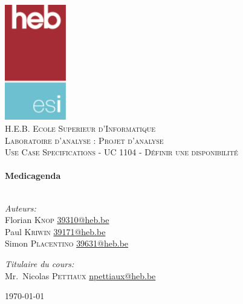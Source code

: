 \begin{titlepage}
	\begin{center}

		\includegraphics[keepaspectratio=true,width=0.20\textwidth]{../ressources/logo}\\[1cm]

		\textsc{\LARGE H.E.B. Ecole Superieur d'Informatique}\\[1.5cm]

		\textsc{\Large Laboratoire d'analyse : Projet d'analyse}\\[0.5cm]
		\textsc{\Large Use Case Specifications - UC 1104 - Définir une
		disponibilité}\\[0.5cm]

		\HRule \\[0.4cm]
		{\huge \bfseries Medicagenda \\[0.4cm]}
		\HRule \\[1.5cm]

		\noindent
		\begin{minipage}[t]{0.4\textwidth}
			\begin{flushleft} \large
				\emph{Auteurs:}\\
				Florian \textsc{Knop} \href{mailto:39310@heb.be}{39310@heb.be}\\
				Paul \textsc{Kriwin} \href{mailto:39171@heb.be}{39171@heb.be}\\
				Simon \textsc{Placentino} \href{mailto:39631@heb.be}{39631@heb.be}\
			\end{flushleft}
		\end{minipage}%
		\begin{minipage}[t]{0.4\textwidth}
			\begin{flushright} \large
				\emph{Titulaire du cours:} \\
				Mr.~Nicolas \textsc{Pettiaux}
				\href{mailto:npettiaux@heb.be}{npettiaux@heb.be}
			\end{flushright}
		\end{minipage}

		\vfill

		{\large \today}

	\end{center}
	\clearpage\null\newpage
\end{titlepage}
